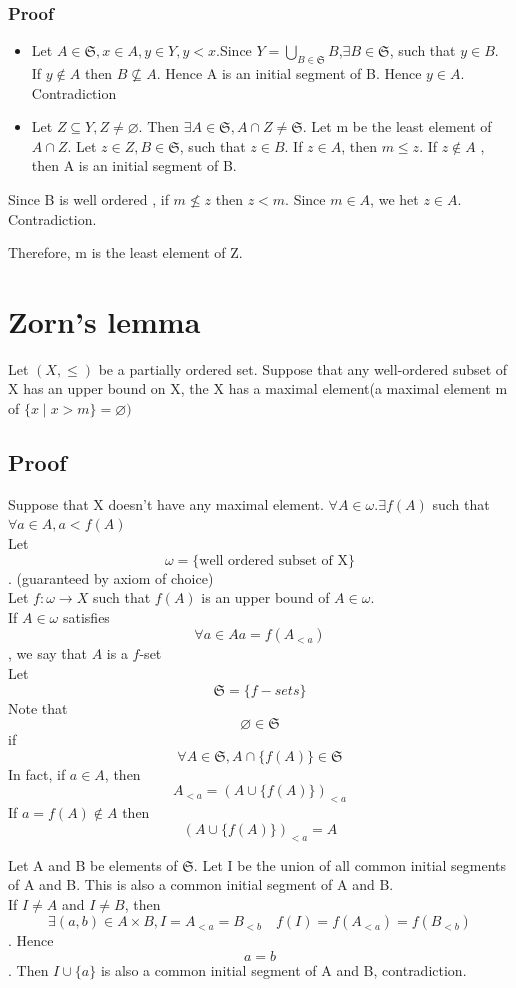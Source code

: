 \documentclass{book}
\begin{document}
\subsection*{Proof}
\begin{itemize}
    \item Let $A\in \mathfrak{S} ,x\in A,y\in Y,y<x$.Since $Y=\bigcup\limits_{B\in \mathfrak{S} }B$,$\exists B\in \mathfrak{S} $, such that $y\in B$. If $y\not\in A$ then $B\not\subseteq A$. Hence A is an initial segment of B. Hence $y\in A$. Contradiction
    \item Let $Z\subseteq Y,Z\not=\varnothing$. Then $\exists A\in \mathfrak{S} , A\cap Z\not=\mathfrak{S} $. Let m be the least element of $A\cap Z.$ Let $z\in Z,B\in \mathfrak{S} $, such that $z\in B$. If $z\in A$, then $m\leq z$. If $z\not\in A$ , then A is an initial segment of B.
\end{itemize}
Since B is well ordered , if $m\not\leq z$ then $z<m$. Since $m\in A$, we het $z\in A$. Contradiction.

Therefore, m is the least element of Z.
\chapter{Zorn's lemma}
Let $(X,\leq)$ be a partially ordered set. Suppose that any well-ordered subset of X has an upper bound on X, the X has a maximal element(a maximal element m of $\{x\mid x> m\}=\varnothing)$
\section{Proof}
Suppose that X doesn't have any maximal element. $\forall A\in \omega.\exists f(A) $ such that $\forall a\in A,a<f(A)$\\Let $$\omega=\{\text{well ordered subset of X}\}$$. (guaranteed by axiom of choice)\\ Let $f:\omega\rightarrow X$ such that $f(A)$ is an upper bound of $A\in \omega$. \\If $A\in \omega$ satisfies $$\forall a\in A a=f(A_{<a})$$ , we say that $A$ is a $f$-set\\
Let $$\mathfrak{S} =\{f-sets\}$$ Note that $$\varnothing\in \mathfrak{S} $$ if $$\forall A\in \mathfrak{S} , A\cap\{f(A)\}\in \mathfrak{S} $$
In fact, if $a\in A$, then $$A_{<a}=(A\cup\{f(A)\})_{<a}$$If $a=f(A)\not\in A$ then $$(A\cup\{f(A)\})_{<a}=A$$

Let A and B be elements of $\mathfrak{S}$. Let I be the union of all common initial segments of A and B. This is also a common initial segment of A and B.\\If $I\not=A$ and $I\not=B$, then $$\exists (a,b)\in A\times B, I=A_{<a}=B_{<b}\quad f(I)=f(A_{<a})=f(B_{<b})$$. Hence $$a=b$$. Then $I\cup\{a\}$ is also a common initial segment of A and B, contradiction.
\end{document}
